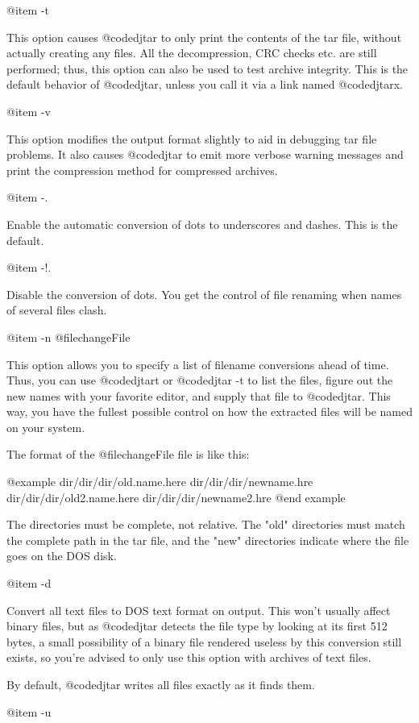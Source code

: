 @item -t

This option causes @code{djtar} to only print the contents of the tar
file, without actually creating any files.  All the decompression, CRC
checks etc. are still performed; thus, this option can also be used to
test archive integrity.  This is the default behavior of
@code{djtar}, unless you call it via a link named @code{djtarx}.

@item -v

This option modifies the output format slightly to aid in debugging tar
file problems.  It also causes @code{djtar} to emit more verbose warning
messages and print the compression method for compressed archives.

@item -.

Enable the automatic conversion of dots to underscores and dashes.  This
is the default.

@item -!.

Disable the conversion of dots.  You get the control of file renaming when
names of several files clash.

@item -n @file{changeFile}

This option allows you to specify a list of filename conversions ahead of
time.  Thus, you can use @code{djtart} or @code{djtar -t} to list the
files, figure out the new names with your favorite editor, and supply that
file to @code{djtar}.  This way, you have the fullest possible control on
how the extracted files will be named on your system.

The format of the @file{changeFile} file is like this:

@example
dir/dir/dir/old.name.here  dir/dir/dir/newname.hre
dir/dir/dir/old2.name.here  dir/dir/dir/newname2.hre
@end example

The directories must be complete, not relative.  The "old" directories
must match the complete path in the tar file, and the "new" directories
indicate where the file goes on the DOS disk.

@item -d

Convert all text files to DOS text format on output.  This won't usually
affect binary files, but as @code{djtar} detects the file type by looking
at its first 512 bytes, a small possibility of a binary file rendered
useless by this conversion still exists, so you're advised to only use
this option with archives of text files.

By default, @code{djtar} writes all files exactly as it finds them.

@item -u

